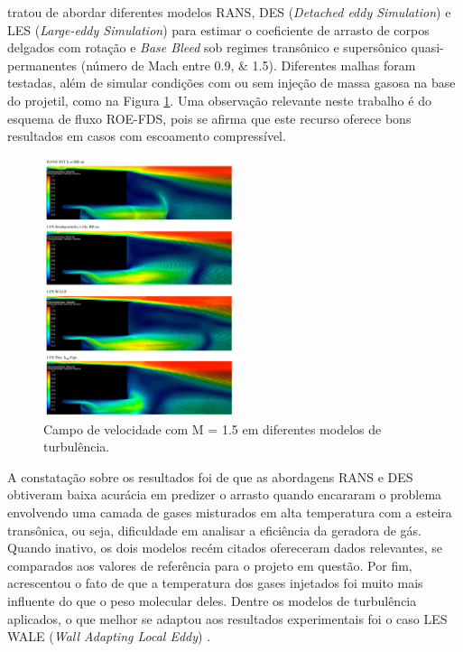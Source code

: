 \citeauthor{nicolas-perez_accuracy_2017} tratou de abordar diferentes modelos RANS, DES (\textit{Detached eddy Simulation}) e LES (\textit{Large-eddy Simulation}) para estimar o coeficiente de arrasto de corpos delgados com rotação e \textit{Base Bleed} sob regimes transônico e supersônico quasi-permanentes (número de Mach entre \numlist{0,9;1,5}). Diferentes malhas foram testadas, além de simular condições com ou sem injeção de massa gasosa na base do projetil, como na Figura \ref{fig10:nicolas2017}. Uma observação relevante neste trabalho é do esquema de fluxo ROE-FDS, pois se afirma que este recurso oferece bons resultados em casos com escoamento compressível.

\begin{figure}[!ht]
	\centering
    \includegraphics[width=0.5\textwidth]{chapter-01/img-cap01/foto10-nicolas2017}
	\caption[Campo de velocidade com M = \num{1,5} em diferentes modelos de turbulência.]{Campo de velocidade com M = \num{1,5} em diferentes modelos de turbulência. \cite{nicolas-perez_accuracy_2017}}
	\label{fig10:nicolas2017}
\end{figure}

A constatação sobre os resultados foi de que as abordagens RANS e DES obtiveram baixa acurácia em predizer o arrasto quando encararam o problema envolvendo uma camada de gases misturados em alta temperatura com a esteira transônica, ou seja, dificuldade em analisar a eficiência da geradora de gás. Quando inativo, os dois modelos recém citados ofereceram dados relevantes, se comparados aos valores de referência para o projeto em questão. Por fim, acrescentou o fato de que a temperatura dos gases injetados foi muito mais influente do que o peso molecular deles. Dentre os modelos de turbulência aplicados, o que melhor se adaptou aos resultados experimentais foi o caso LES WALE (\textit{Wall Adapting Local Eddy}) \cite{nicolas-perez_accuracy_2017}.

